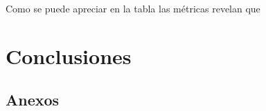 \documentclass[12pt,letterpaper]{article}
\begin{document}
Como se puede apreciar en la tabla las métricas revelan que





\section{Conclusiones}




\subsection{Anexos}
\end{document}
